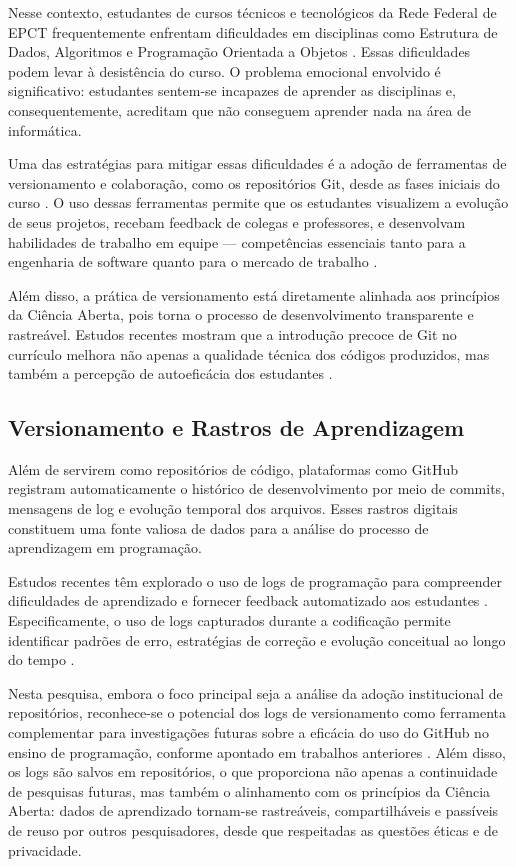 \documentclass[english, spanish, brazilian]{RBIEarticle}
\begin{document}
Nesse contexto, estudantes de cursos técnicos e tecnológicos da Rede Federal de EPCT frequentemente enfrentam dificuldades em disciplinas como Estrutura de Dados, Algoritmos e Programação Orientada a Objetos \cite{qian2017}. Essas dificuldades podem levar à desistência do curso. O problema emocional envolvido é significativo: estudantes sentem-se incapazes de aprender as disciplinas e, consequentemente, acreditam que não conseguem aprender nada na área de informática.

Uma das estratégias para mitigar essas dificuldades é a adoção de ferramentas de versionamento e colaboração, como os repositórios Git, desde as fases iniciais do curso \cite{vanGeest2024}. O uso dessas ferramentas permite que os estudantes visualizem a evolução de seus projetos, recebam feedback de colegas e professores, e desenvolvam habilidades de trabalho em equipe — competências essenciais tanto para a engenharia de software quanto para o mercado de trabalho \cite{borges2016}.

Além disso, a prática de versionamento está diretamente alinhada aos princípios da Ciência Aberta, pois torna o processo de desenvolvimento transparente e rastreável. Estudos recentes mostram que a introdução precoce de Git no currículo melhora não apenas a qualidade técnica dos códigos produzidos, mas também a percepção de autoeficácia dos estudantes \cite{momcheva2025}.

\subsection{Versionamento e Rastros de Aprendizagem}

Além de servirem como repositórios de código, plataformas como GitHub registram automaticamente o histórico de desenvolvimento por meio de commits, mensagens de log e evolução temporal dos arquivos. Esses rastros digitais constituem uma fonte valiosa de dados para a análise do processo de aprendizagem em programação.

Estudos recentes têm explorado o uso de logs de programação para compreender dificuldades de aprendizado e fornecer feedback automatizado aos estudantes \cite{qian2017, nascimento2026logs}. Especificamente, o uso de logs capturados durante a codificação permite identificar padrões de erro, estratégias de correção e evolução conceitual ao longo do tempo \cite{nascimento2026logs}.

Nesta pesquisa, embora o foco principal seja a análise da adoção institucional de repositórios, reconhece-se o potencial dos logs de versionamento como ferramenta complementar para investigações futuras sobre a eficácia do uso do GitHub no ensino de programação, conforme apontado em trabalhos anteriores \cite{nascimento2026logs}. Além disso, os logs são salvos em repositórios, o que proporciona não apenas a continuidade de pesquisas futuras, mas também o alinhamento com os princípios da Ciência Aberta: dados de aprendizado tornam-se rastreáveis, compartilháveis e passíveis de reuso por outros pesquisadores, desde que respeitadas as questões éticas e de privacidade.
\end{document}
